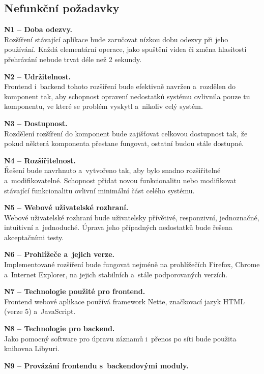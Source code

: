 \documentclass[thesis=M,czech]{FITthesis}[2012/06/26]
\begin{document}
\subsection{Nefunkční požadavky} \label{subsec:analyza_np}
  \begin{description}
    \item \textbf{N1 -- Doba odezvy.\\}
    Rozšíření stávající aplikace bude zaručovat nízkou dobu odezvy při jeho používání. Každá elementární operace, jako spuštění videa či změna hlasitosti přehrávání nebude trvat déle než 2 sekundy.
    \item \textbf{N2 -- Udržitelnost.\\}
	Frontend i~backend tohoto rozšíření bude efektivně navržen a~rozdělen do komponent tak, aby schopnost opravení nedostatků systému ovlivnila pouze tu komponentu, ve které se problém vyskytl a~nikoliv celý systém.
    \item \textbf{N3 -- Dostupnost.\\}
	Rozdělení rozšíření do komponent bude zajišťovat celkovou dostupnost tak, že pokud některá komponenta přestane fungovat, ostatní budou stále dostupné.
    \item \textbf{N4 -- Rozšiřitelnost.\\}
	Řešení bude navrhnuto a~vytvořeno tak, aby bylo snadno rozšiřitelné a~modifikovatelné. Schopnost přidat novou funkcionalitu nebo modifikovat stávající funkcionalitu ovlivní minimální část celého systému.
    \item \textbf{N5 -- Webové uživatelské rozhraní.\\}
	Webové uživatelské rozhraní bude uživatelsky přívětivé, responzivní, jednoznačné, intuitivní a~jednoduché. Úprava jeho případných nedostatků bude řešena akceptačními testy.
    \item \textbf{N6 -- Prohlížeče a~jejich verze.\\}
	Implementované rozšíření bude fungovat nejméně na prohlížečích Firefox, Chrome a~Internet Explorer, na jejich stabilních a~stále podporovaných verzích.
    \item \textbf{N7 -- Technologie použité pro frontend.\\}
	Frontend webové aplikace používá framework Nette, značkovací jazyk HTML (verze 5) a~JavaScript.
    \item \textbf{N8 -- Technologie pro backend.\\}
	Jako pomocný software pro úpravu záznamů i~přenos po síti bude použita knihovna Libyuri.
    \item \textbf{N9 -- Provázání frontendu s~backendovými moduly.\\}

\end{description}
\end{document}
